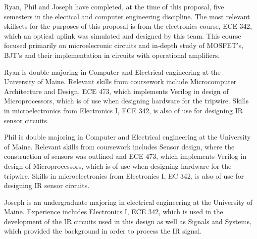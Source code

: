 
	
Ryan, Phil and Joseph have completed, at the time of this proposal, five semesters in the electical and computer engineering discipline. The most relevant skillsets for the purposes of this proposal is from the electronics course, ECE 342, which an optical uplink was simulated and designed by this team. This course focused primarily on microelecronic circuits and in-depth study of MOSFET's, BJT's and their implementation in circuits with operational amplifiers. 

Ryan is double majoring in Computer and Electrical engineering at the University of Maine. Relevant skills from coursework include Microcomputer Architecture and Design, ECE 473, which implements Verilog in design of Microprocessors, which is of use when designing hardware for the tripwire. Skills in microelectronics from Electronics I, ECE 342, is also of use for designing IR sensor circuits.

Phil is double majoring in Computer and Electrical engineering at the University of Maine. Relevant skills from coursework includes Sensor design, where the construction of sensors was outlined and  ECE 473, which implements Verilog in design of Microprocessors, which is of use when designing hardware for the tripwire. Skills in microelectronics from Electronics I, EC 342, is also of use for designing IR sensor circuits.

Joseph is an undergraduate majoring in electrical engineering at the University of Maine. Experience includes Electronics I, ECE 342, which is used in the development of the IR circuits used in this design as well as Signals and Systems, which provided the background in order to process the IR signal.
